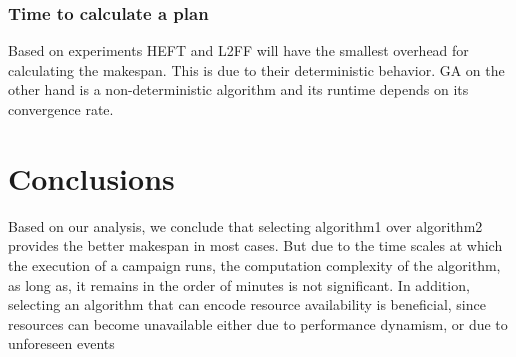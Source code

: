 \subsubsection{Time to calculate a plan}

Based on experiments HEFT and L2FF will have the smallest overhead for calculating the makespan.
This is due to their deterministic behavior.
GA on the other hand is a non-deterministic algorithm and its runtime depends on its convergence rate.

\section{Conclusions}

Based on our analysis, we conclude that selecting algorithm1 over algorithm2 provides the better makespan in most cases. 
But due to the time scales at which the execution of a campaign runs, the computation complexity of the algorithm, as long as, it remains in the order of minutes is not significant.
In addition, selecting an algorithm that can encode resource availability is beneficial, since resources can become unavailable either due to performance dynamism, or due to unforeseen events